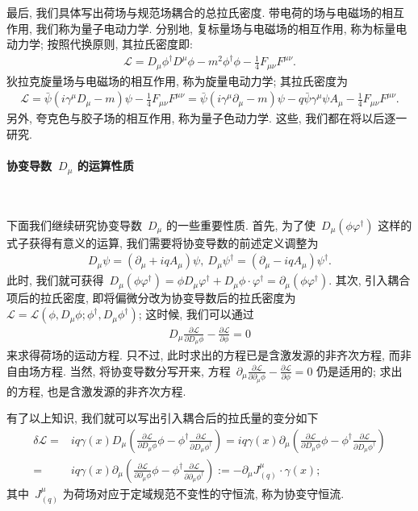 最后, 我们具体写出荷场与规范场耦合的总拉氏密度. 带电荷的场与电磁场的相互作用, 我们称为量子电动力学. 分别地, 复标量场与电磁场的相互作用, 称为标量电动力学; 按照代换原则, 其拉氏密度即:
\begin{align}
\mathcal{L}=D_\mu\phi^\dag D^\mu\phi-m^2\phi^\dag\phi-\frac{1}{4}F_{\mu\nu}F^{\mu\nu}.
\end{align}
狄拉克旋量场与电磁场的相互作用, 称为旋量电动力学; 其拉氏密度为
\begin{align}
\mathcal{L}=\bar{\psi}(i\gamma^\mu D_\mu-m)\psi-\frac{1}{4}F_{\mu\nu}F^{\mu\nu}=\bar{\psi}(i\gamma^\mu \partial_\mu-m)\psi-q\bar{\psi}\gamma^\mu\psi A_\mu-\frac{1}{4}F_{\mu\nu}F^{\mu\nu}.
\end{align}
另外, 夸克色与胶子场的相互作用, 称为量子色动力学. 这些, 我们都在将以后逐一研究.




\paragraph{协变导数~$D_\mu$ 的运算性质}
~

下面我们继续研究协变导数~$D_\mu$ 的一些重要性质. 首先, 为了使~$D_\mu(\phi\varphi^\dag)$ 这样的式子获得有意义的运算, 我们需要将协变导数的前述定义调整为
\begin{align}
D_\mu\psi=(\partial_\mu+iqA_\mu)\psi,~D_\mu\psi^\dag=(\partial_\mu-iqA_\mu)\psi^\dag.
\end{align}
此时, 我们就可获得~$D_\mu(\phi\varphi^\dag)=\phi D_\mu\varphi^\dag+D_\mu\phi\cdot\varphi^\dag=\partial_\mu(\phi\varphi^\dag)$. 其次, 引入耦合项后的拉氏密度, 即将偏微分改为协变导数后的拉氏密度为~$\mathcal{L}=\mathcal{L}(\phi,D_\mu\phi;\phi^\dag,D_\mu\phi^\dag)$; 这时候, 我们可以通过
\begin{align}
D_\mu\frac{\partial\mathcal{L}}{\partial D_\mu\phi}-\frac{\partial\mathcal{L}}{\partial\phi}=0
\end{align}
来求得荷场的运动方程. 只不过, 此时求出的方程已是含激发源的非齐次方程, 而非自由场方程. 当然, 将协变导数分写开来, 方程~$\partial_\mu\frac{\partial\mathcal{L}}{\partial\partial_\mu\phi}-\frac{\partial\mathcal{L}}{\partial\phi}=0$ 仍是适用的; 求出的方程, 也是含激发源的非齐次方程.

有了以上知识, 我们就可以写出引入耦合后的拉氏量的变分如下
\begin{align}
\delta\mathcal{L}=&iq\gamma(x) D_\mu\left(\frac{\partial\mathcal{L}}{\partial D_\mu\phi}\phi-\phi^\dag\frac{\partial\mathcal{L}}{\partial D_\mu\phi^\dag}\right)
=iq\gamma(x) \partial_\mu\left(\frac{\partial\mathcal{L}}{\partial D_\mu\phi}\phi-\phi^\dag\frac{\partial\mathcal{L}}{\partial D_\mu\phi^\dag}\right)\nonumber\\
=&iq\gamma(x) \partial_\mu\left(\frac{\partial\mathcal{L}}{\partial \partial_\mu\phi}\phi-\phi^\dag\frac{\partial\mathcal{L}}{\partial \partial_\mu\phi^\dag}\right):=-\partial_\mu J^\mu_{(q)}\cdot\gamma(x);
\end{align}
其中~$J^\mu_{(q)}$ 为荷场对应于定域规范不变性的守恒流, 称为协变守恒流.





